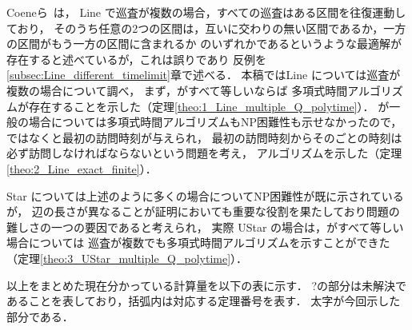 Coeneら~\cite{coene2011charlemagne}は，
Line で巡査が複数の場合，すべての巡査はある区間を往復運動しており，
そのうち任意の2つの区間は，互いに交わりの無い区間であるか，一方の区間がもう一方の区間に含まれるか
のいずれかであるというような最適解が存在すると述べているが，これは誤りであり
反例を\ref{subsec:Line_different_timelimit}章で述べる．
本稿ではLine については巡査が複数の場合について調べ，
まず，{\timelimit}がすべて等しいならば
多項式時間アルゴリズムが存在することを示した（定理\ref{theo:1_Line_multiple_Q_polytime}）．
{\timelimit}が一般の場合については多項式時間アルゴリズムもNP困難性も示せなかったので，
{\timelimit}ではなく{\period}と最初の訪問時刻が与えられ，
最初の訪問時刻からその{\period}ごとの時刻は必ず訪問しなければならないという問題を考え，
アルゴリズムを示した（定理\ref{theo:2_Line_exact_finite}）．

Star については上述のように多くの場合についてNP困難性が既に示されているが，
辺の長さが異なることが証明においても重要な役割を果たしており問題の難しさの一つの要因であると考えられ，
実際 UStar の場合は，{\timelimit}がすべて等しい場合については
巡査が複数でも多項式時間アルゴリズムを示すことができた（定理\ref{theo:3_UStar_multiple_Q_polytime}）．




以上をまとめた現在分かっている計算量を以下の表に示す．
?の部分は未解決であることを表しており，括弧内は対応する定理番号を表す．
太字が今回示した部分である．


